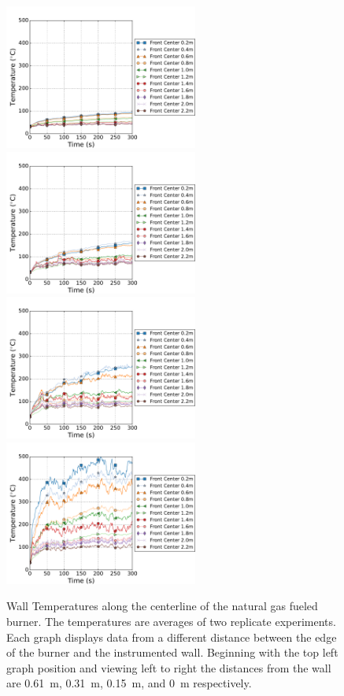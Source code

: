 \documentclass[twoside]{uocthesis}
\begin{document}
{\begin{figure}[ht!]
	\centering
		\includegraphics[width=2.5in]{../Figures/TWNG01_TC_Surface_Center_Avg}
		\includegraphics[width=2.5in]{../Figures/TWNG03_TC_Surface_Center_Avg}\\
		\includegraphics[width=2.5in]{../Figures/TWNG05_TC_Surface_Center_Avg}
		\includegraphics[width=2.5in]{../Figures/TWNG07_TC_Surface_Center_Avg}\\
	\caption[Wall Temperatures along the centerline of the natural gas fueled burner]{Wall Temperatures along the centerline of the natural gas fueled burner. The temperatures are averages of two replicate experiments. Each graph displays data from a different distance between the edge of the burner and the instrumented wall.  Beginning with the top left graph position and viewing left to right the distances from the wall are 0.61~m, 0.31~m, 0.15~m, and 0~m respectively.}
	\label{TC_Surf_Cent_TWNG_comp}
\end{figure}

}
\end{document}
